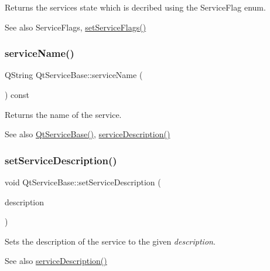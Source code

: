 Returns the service\textquotesingle{}s state which is decribed using the Service\+Flag enum.

\begin{DoxySeeAlso}{See also}
Service\+Flags, \hyperlink{class_qt_service_base_a3f8a07d0cf536720e7fcf1ec562635d1}{set\+Service\+Flags()} 
\end{DoxySeeAlso}
\mbox{\label{class_qt_service_base_a643f253b3931e6a6c4e8caa190756214}} 
\subsubsection{\texorpdfstring{service\+Name()}{serviceName()}}
{\footnotesize\ttfamily Q\+String Qt\+Service\+Base\+::service\+Name (\begin{DoxyParamCaption}{ }\end{DoxyParamCaption}) const}

Returns the name of the service.

\begin{DoxySeeAlso}{See also}
\hyperlink{class_qt_service_base_a75e3f82739df6dc0b9aa899b3f9552eb}{Qt\+Service\+Base()}, \hyperlink{class_qt_service_base_a6cf3ef7bc5d85acb31e99a85fde47397}{service\+Description()} 
\end{DoxySeeAlso}
\mbox{\label{class_qt_service_base_a09d7547436c65a900f18c58b2a650286}} 
\subsubsection{\texorpdfstring{set\+Service\+Description()}{setServiceDescription()}}
{\footnotesize\ttfamily void Qt\+Service\+Base\+::set\+Service\+Description (\begin{DoxyParamCaption}\item[{const Q\+String \&}]{description }\end{DoxyParamCaption})}

Sets the description of the service to the given {\itshape description}.

\begin{DoxySeeAlso}{See also}
\hyperlink{class_qt_service_base_a6cf3ef7bc5d85acb31e99a85fde47397}{service\+Description()} 
\end{DoxySeeAlso}
\mbox{\label{class_qt_service_base_a3f8a07d0cf536720e7fcf1ec562635d1}} 
